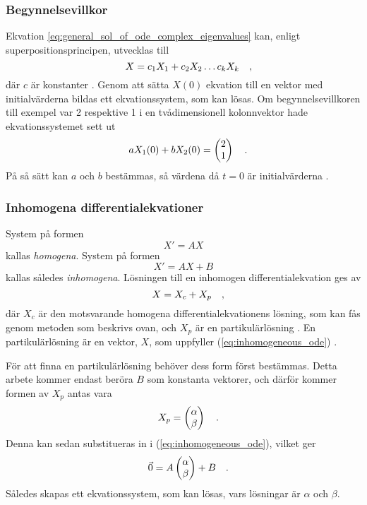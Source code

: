 \subsubsection{Begynnelsevillkor}
Ekvation \ref{eq:general_sol_of_ode_complex_eigenvalues} kan, enligt superpositionsprincipen, utvecklas till
\begin{equation}
    X=c_1 X_1 + c_2 X_2\hdots c_k X_k
\quad\mathrm{,}\!\!\!\!\!\!\end{equation} där \(c\) är konstanter \parencite[332-333]{zill_differential_2005}. Genom att sätta \(X(0)\) ekvation till en vektor med initialvärderna bildas ett ekvationssystem, som kan lösas. Om begynnelsevillkoren till exempel var 2 respektive 1 i en tvådimensionell kolonnvektor hade ekvationssystemet sett ut
\begin{equation}
    aX_1(0)+bX_2(0)=
    \begin{pmatrix}2\\1\end{pmatrix}
\quad\mathrm{.}\!\!\!\!\!\!\end{equation} På så sätt kan \(a\) och \(b\) bestämmas, så värdena då \(t=0\) är initialvärderna \parencite[348-349]{zill_differential_2005}.

\subsubsection{Inhomogena differentialekvationer}
System på formen
\begin{equation}
    X'=AX
\end{equation} kallas \emph{homogena}. System på formen
\begin{equation}\label{eq:inhomogeneous_ode}
    X'=AX+B
\end{equation} kallas således \emph{inhomogena}. Lösningen till en inhomogen differentialekvation ges av
\begin{equation}\label{eq:sol_of_inhomogeneous_ode}
    X=X_c+X_p
\quad\mathrm{,}\!\!\!\!\!\!\end{equation} där \(X_c\) är den motsvarande homogena differentialekvationens lösning, som kan fås genom metoden som beskrivs ovan, och \(X_p\) är en partikulärlösning \parencites[336]{zill_differential_2005}[188]{alfredsson_matematik_2013}. En partikulärlösning är en vektor, \(X\), som uppfyller (\ref{eq:inhomogeneous_ode}) \parencite[335]{zill_differential_2005}.

För att finna en partikulärlösning behöver dess form först bestämmas. Detta arbete kommer endast beröra \(B\) som konstanta vektorer, och därför kommer formen av \(X_p\) antas vara
\begin{equation}
    X_p=\begin{pmatrix}
        \alpha\\\beta
    \end{pmatrix}
\quad\mathrm{.}\!\!\!\!\!\!\end{equation}
Denna kan sedan substitueras in i (\ref{eq:inhomogeneous_ode}), vilket ger
\begin{equation}
    \vec{0}=A\begin{pmatrix}
        \alpha\\\beta
    \end{pmatrix}+B
\quad\mathrm{.}\!\!\!\!\!\!\end{equation} Således skapas ett ekvationssystem, som kan lösas, vars lösningar är \(\alpha\) och \(\beta\).

